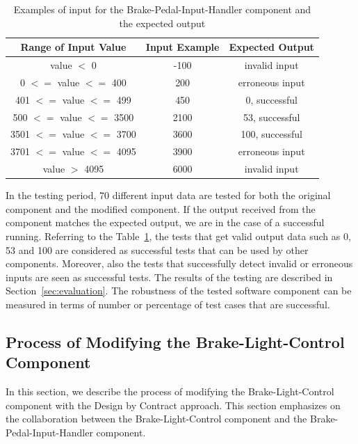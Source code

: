 \begin{table}[htb]
\centering
\begin{tabular}{|c|c|c|}\hline
Range of Input Value & Input Example & Expected Output \\ \hline
value $<$ 0 & -100 & invalid input\\ \hline
0 $<=$ value $<=$ 400 & 200 & erroneous input\\ \hline
401 $<=$ value $<=$ 499 & 450 & 0, successful\\ \hline
500 $<=$ value $<=$ 3500 & 2100 & 53, successful\\ \hline
3501 $<=$ value $<=$ 3700 & 3600 & 100, successful\\ \hline
3701 $<=$ value $<=$ 4095 & 3900 & erroneous input\\ \hline
value $>$ 4095 & 6000 & invalid input\\ \hline
\end{tabular}
\caption{Examples of input for the Brake-Pedal-Input-Handler component and the expected output}
\label{tab:BPIHExpectedOutput}
\vspace{-.4cm}
\end{table}


In the testing period, 70 different input data are tested for both the original component and the modified component. If the output received from the component matches the expected output, we are in the case of a successful running. Referring to the Table~\ref{tab:BPIHExpectedOutput}, the tests that get valid output data such as 0, 53 and 100 are considered as successful tests that can be used by other components. Moreover, also 
the tests that successfully detect invalid or erroneous inputs are seen as successful tests. The results of the testing are described in Section~\ref{sec:evaluation}. The robustness of the tested software component can be measured in terms of number or percentage of  %
 test cases that are successful.

\subsection{Process of Modifying the Brake-Light-Control Component}

In this section, we describe the process of modifying the Brake-Light-Control component with the Design by Contract approach. This section emphasizes on the collaboration between the Brake-Light-Control component and the Brake-Pedal-Input-Handler component.

